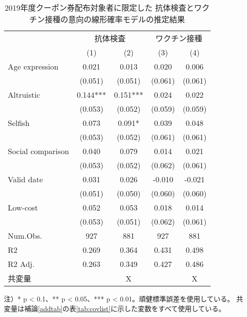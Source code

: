 \documentclass[
  11pt,
  a4paper,
]{article}
\begin{document}
\begin{table}

\caption{\label{tab:show-int-coupon1-reg}2019年度クーポン券配布対象者に限定した 抗体検査とワクチン接種の意向の線形確率モデルの推定結果}
\centering
\begin{threeparttable}
\begin{tabular}[t]{lcccc}
\toprule
\multicolumn{1}{c}{ } & \multicolumn{2}{c}{抗体検査} & \multicolumn{2}{c}{ワクチン接種} \\
\cmidrule(l{3pt}r{3pt}){2-3} \cmidrule(l{3pt}r{3pt}){4-5}
  & (1) & (2) & (3) & (4)\\
\midrule
Age expression & 0.021 & 0.013 & 0.020 & 0.006\\
 & (0.051) & (0.051) & (0.061) & (0.061)\\
Altruistic & 0.144*** & 0.151*** & 0.024 & 0.022\\
 & (0.053) & (0.052) & (0.059) & (0.059)\\
Selfish & 0.073 & 0.091* & 0.039 & 0.048\\
 & (0.053) & (0.052) & (0.061) & (0.061)\\
Social comparison & 0.040 & 0.079 & 0.014 & 0.021\\
 & (0.053) & (0.052) & (0.062) & (0.061)\\
Valid date & 0.031 & 0.026 & -0.010 & -0.021\\
 & (0.051) & (0.050) & (0.060) & (0.060)\\
Low-cost & 0.052 & 0.053 & 0.018 & 0.014\\
 & (0.053) & (0.051) & (0.062) & (0.061)\\
\midrule
Num.Obs. & 927 & 881 & 927 & 881\\
R2 & 0.269 & 0.364 & 0.431 & 0.498\\
R2 Adj. & 0.263 & 0.349 & 0.427 & 0.486\\
共変量 &  & X &  & X\\
\bottomrule
\end{tabular}
\begin{tablenotes}
\item 注）* p < 0.1、** p < 0.05、*** p < 0.01。頑健標準誤差を使用している。 共変量は補論\ref{addtab}の表\ref{tab:covlist}に示した変数をすべて使用している。
\end{tablenotes}
\end{threeparttable}
\end{table}
\end{document}

